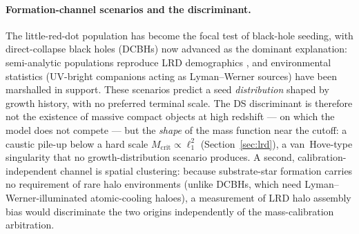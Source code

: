 \documentclass[11pt,a4paper]{article}
\theoremstyle{plain}
\theoremstyle{remark}
\begin{document}
\paragraph{Formation-channel scenarios and the discriminant.} The little-red-dot population has become the focal test of black-hole seeding, with direct-collapse black holes (DCBHs) now advanced as the dominant explanation: semi-analytic populations reproduce LRD demographics \cite{jeon2026}, and environmental statistics (UV-bright companions acting as Lyman--Werner sources) have been marshalled in support. These scenarios predict a seed \emph{distribution} shaped by growth history, with no preferred terminal scale. The DS discriminant is therefore not the existence of massive compact objects at high redshift --- on which the model does not compete --- but the \emph{shape} of the mass function near the cutoff: a caustic pile-up below a hard scale $M_{\text{crit}} \propto \ell_1^2$ (Section~\ref{sec:lrd}), a van~Hove-type singularity that no growth-distribution scenario produces. A second, calibration-independent channel is spatial clustering: because substrate-star formation carries no requirement of rare halo environments (unlike DCBHs, which need Lyman--Werner-illuminated atomic-cooling haloes), a measurement of LRD halo assembly bias would discriminate the two origins independently of the mass-calibration arbitration.
\end{document}
